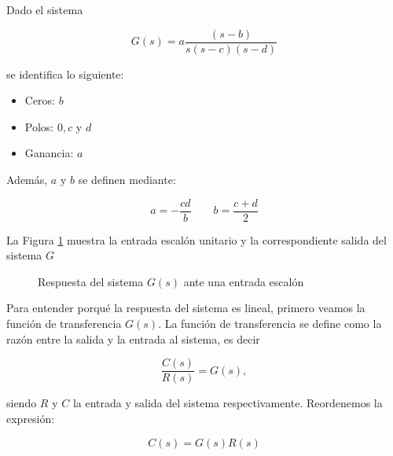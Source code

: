 Dado el sistema

\begin{equation}
    G(s) = a\frac{(s - b)}{s(s-c)(s-d)}
\end{equation}

\noindent se identifica lo siguiente:
\begin{itemize}
    \item Ceros: $b$
    \item Polos: $0, c$ y $d$
    \item Ganancia: $a$
\end{itemize}


\noindent Además, $a$ y $b$ se definen mediante:

\begin{equation*}
    a = -\frac{cd}{b} \qquad b = \frac{c + d}{2}
\end{equation*}

La Figura \ref{fig:1} muestra la entrada escalón unitario y la correspondiente salida del sistema $G$

\begin{figure}[ht!]
    \centering
    \caption{Respuesta del sistema $G(s)$ ante una entrada escalón}
    \label{fig:1}
\end{figure}


Para entender porqué la respuesta del sistema es lineal, primero veamos la función de transferencia $G(s)$. La función de transferencia se define como la razón entre la salida y la entrada al sistema, es decir

\begin{equation}
    \frac{C(s)}{R(s)} = G(s),
\end{equation}

\noindent siendo $R$ y $C$ la entrada y salida del sistema respectivamente. Reordenemos la expresión:

\begin{equation*}
    C(s) = G(s)R(s)   
\end{equation*}



